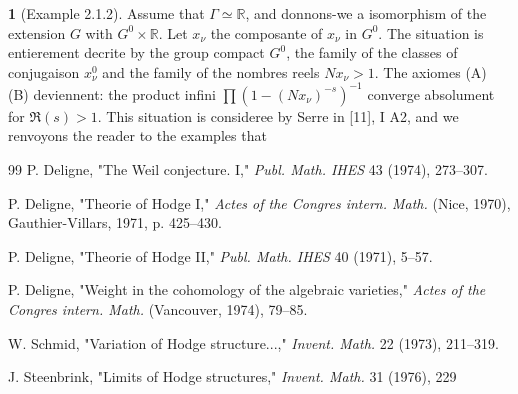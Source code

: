 \documentclass[12pt,a4paper]{article}
\theoremstyle{plain}
\theoremstyle{definition}
\theoremstyle{definition}
\newtheorem{para}{}[section]
\theoremstyle{remark}
\begin{document}
\begin{para}[Example 2.1.2]
Assume that $\Gamma \simeq \mathbb{R}$, and donnons-we a isomorphism of the extension $G$ with $G^0 \times \mathbb{R}$. Let $x_\nu$ the composante of $x_\nu$ in $G^0$. The situation is entierement decrite by the group compact $G^0$, the family of the classes of conjugaison $x_\nu^0$ and the family of the nombres reels $Nx_\nu > 1$. The axiomes (A) (B) deviennent: the product infini $\prod(1 - (Nx_\nu)^{-s})^{-1}$ converge absolument for $\Re(s) > 1$. This situation is consideree by Serre in [11], I A2, and we renvoyons the reader to the examples that 
\end{para}


\newpage
\begin{thebibliography}{99}
P. Deligne, "The Weil conjecture. I," \emph{Publ. Math. IHES} 43 (1974), 273--307.

P. Deligne, "Theorie of Hodge I," \emph{Actes of the Congres intern. Math.} (Nice, 1970), Gauthier-Villars, 1971, p. 425--430.

P. Deligne, "Theorie of Hodge II," \emph{Publ. Math. IHES} 40 (1971), 5--57.

P. Deligne, "Weight in the cohomology of the algebraic varieties," \emph{Actes of the Congres intern. Math.} (Vancouver, 1974), 79--85.

W. Schmid, "Variation of Hodge structure...," \emph{Invent. Math.} 22 (1973), 211--319.

J. Steenbrink, "Limits of Hodge structures," \emph{Invent. Math.} 31 (1976), 229
\end{thebibliography}
\end{document}

